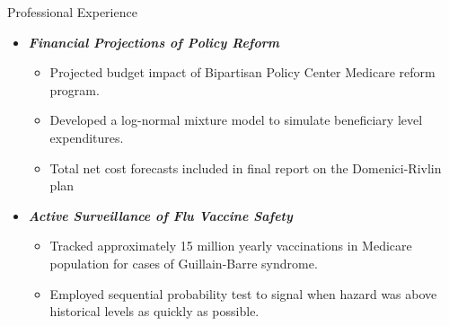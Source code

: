 \documentclass{resume} %
\begin{document}
\begin{rSection}{Professional Experience}
\begin{itemize}
\begin{itemize}
    	\item {\bf \em Financial Projections of Policy Reform}
        \begin{itemize} \itemsep -0.2em
    		\item Projected budget impact of Bipartisan Policy Center Medicare reform program.
            \item Developed a log-normal mixture model to simulate beneficiary level expenditures.
            \item Total net cost forecasts included in final report on the Domenici-Rivlin plan
    	\end{itemize}
        \item {\bf \em Active Surveillance of Flu Vaccine Safety}
        \begin{itemize} \itemsep -0.2em
        	\item Tracked approximately 15 million yearly vaccinations in Medicare population for cases of Guillain-Barre syndrome.
            \item Employed sequential probability test to signal when hazard was above historical levels as quickly as possible.
        \end{itemize}
    \end{itemize}
\end{itemize}
\end{rSection}

\vspace{0.4em}
\end{document}
